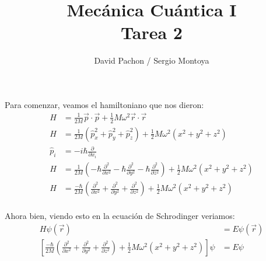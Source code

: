 \documentclass{report}
\title{\Huge{Mecánica Cuántica I}\\Tarea 2}
\author{\huge{David Pachon / Sergio Montoya}}
\date{}
\begin{document}
\maketitle
\newpage%
\tableofcontents
\pagebreak

\chapter{}

\chapter{}

\chapter{}

Para comenzar, veamos el hamiltoniano que nos dieron:
\begin{align*}
  H &= \frac{1}{2M}\vec{p}\cdot\vec{p} + \frac{1}{2}M\omega^2 \vec{r}\cdot\vec{r}\\
  H &= \frac{1}{2M}\left( \hat{p}_x^2 + \hat{p}_y^2 + \hat{p}_z^2 \right) + \frac{1}{2}M\omega^2 \left(x^2 + y^2 + z^2\right)\\
  \hat{p}_i &= - i\hbar \frac{\partial}{\partial x_i}\\
  H &= \frac{1}{2M}\left(  - \hbar \frac{\partial^2}{\partial x^2} - \hbar \frac{\partial^2}{\partial y^2} - \hbar \frac{\partial^2}{\partial z^2}\right) + \frac{1}{2}M\omega^2 \left(x^2 + y^2 + z^2\right)\\
  H &= \frac{-\hbar}{2M}\left(  \frac{\partial^2}{\partial x^2} + \frac{\partial^2}{\partial y^2} + \frac{\partial^2}{\partial z^2}\right) + \frac{1}{2}M\omega^2 \left(x^2 + y^2 + z^2\right)\\
\end{align*}

Ahora bien, viendo esto en la ecuación de Schrodinger veriamos:
\begin{align*}
  H\psi(\vec{r}) &= E\psi(\vec{r})\\
  \left[\frac{-\hbar}{2M}\left(  \frac{\partial^2}{\partial x^2} + \frac{\partial^2}{\partial y^2} + \frac{\partial^2}{\partial z^2}\right) + \frac{1}{2}M\omega^2 \left(x^2 + y^2 + z^2\right)\right]\psi &= E\psi
\end{align*}
\end{document}
